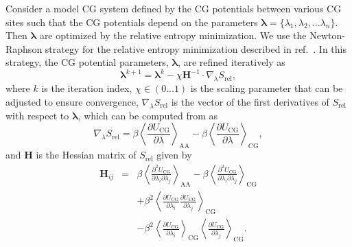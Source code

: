 Consider a model CG system defined by the CG potentials between various CG sites
such that the CG potentials depend on the parameters
$\boldsymbol\lambda=\{\lambda_1,\lambda_2,...\lambda_n\}$. Then
$\boldsymbol\lambda$ are optimized by the relative entropy minimization. We use
the Newton-Raphson strategy for the relative entropy minimization described in
ref.~\cite{Chaimovich2011}. In this strategy, the CG potential parameters,
$\boldsymbol\lambda$, are refined iteratively as
\begin{equation}
\label{eq:newtraph}
\boldsymbol{\lambda} ^{k+1} = \boldsymbol{\lambda} ^{k} -
\chi \mathbf{H} ^{-1}\cdot
\nabla_{\lambda} S_{\text{rel}} ,
\end{equation}
where $k$ is the iteration index, $\chi\in(0...1)$ is the scaling parameter that
can be adjusted to ensure convergence, $\nabla_{\lambda}S_{\text{rel}}$ is the
vector of the first derivatives of $S_{\text{rel}}$ with respect to
$\boldsymbol\lambda$, which can be computed from  as
\begin{equation}
\label{eq:dsrel}
\nabla_{\lambda}S_{\text{rel}} = \beta \left\langle \frac{\partial
  U_{\text{CG}}}{\partial\lambda}\right\rangle_{\text{AA}} - \beta\left\langle
\frac{\partial U_{\text{CG}}}{\partial\lambda}\right\rangle_{\text{CG}} ,
\end{equation}
and $\mathbf{H}$ is the Hessian matrix of $S_{\text{rel}}$ given by
\begin{eqnarray}
\label{eq:Hsrel}
\mathbf{H}_{ij}&=&\beta \left\langle \frac{\partial^2
  U_{\text{CG}}}{\partial\lambda_i\partial\lambda_j}\right \rangle_{\text{AA}} -
\beta \left\langle \frac{\partial^2
  U_{\text{CG}}}{\partial\lambda_i\partial\lambda_j}\right \rangle_{\text{CG}}
\nonumber\\ &&+ \beta^2 \left\langle \frac{\partial
  U_{\text{CG}}}{\partial\lambda_i} \frac{\partial
  U_{\text{CG}}}{\partial\lambda_j}\right\rangle_{\text{CG}} \nonumber\\ &&-
\beta^2 \left\langle \frac{\partial
  U_{\text{CG}}}{\partial\lambda_i}\right\rangle_{\text{CG}} \left\langle
\frac{\partial U_{\text{CG}}}{\partial\lambda_j}\right\rangle_{\text{CG}}.
\end{eqnarray}

